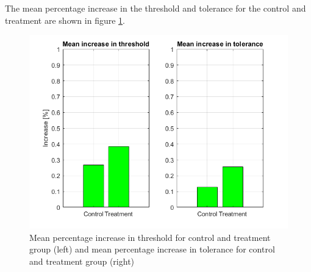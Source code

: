 The mean percentage increase in the threshold and tolerance for the control and treatment are shown in figure \ref{fig:mean_increase_all}. 
 
\begin{figure}[H]                                         %
	\includegraphics[width=1\textwidth]{figures/mean_increase_all.PNG}  %
	\caption{Mean percentage increase in threshold for control and treatment group (left) and mean percentage increase in tolerance for control and treatment group (right)}
	\label{fig:mean_increase_all}  %
\end{figure}               %
